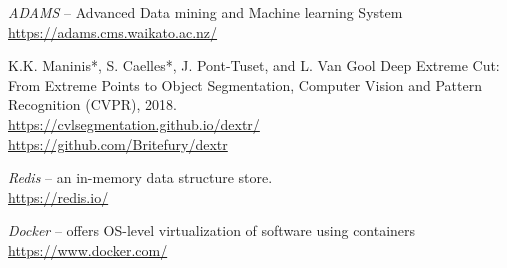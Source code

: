 
\begin{thebibliography}{999}

		\textit{ADAMS} -- Advanced Data mining and Machine learning System \\
		\url{https://adams.cms.waikato.ac.nz/}{}

		K.K. Maninis*, S. Caelles*, J. Pont-Tuset, and L. Van Gool
        Deep Extreme Cut: From Extreme Points to Object Segmentation,
        Computer Vision and Pattern Recognition (CVPR), 2018. \\
		\url{https://cvlsegmentation.github.io/dextr/}{} \\
		\url{https://github.com/Britefury/dextr}{}

		\textit{Redis} -- an in-memory data structure store. \\
		\url{https://redis.io/}{}

		\textit{Docker} -- offers OS-level virtualization of software using containers \\
		\url{https://www.docker.com/}{}

\end{thebibliography}

